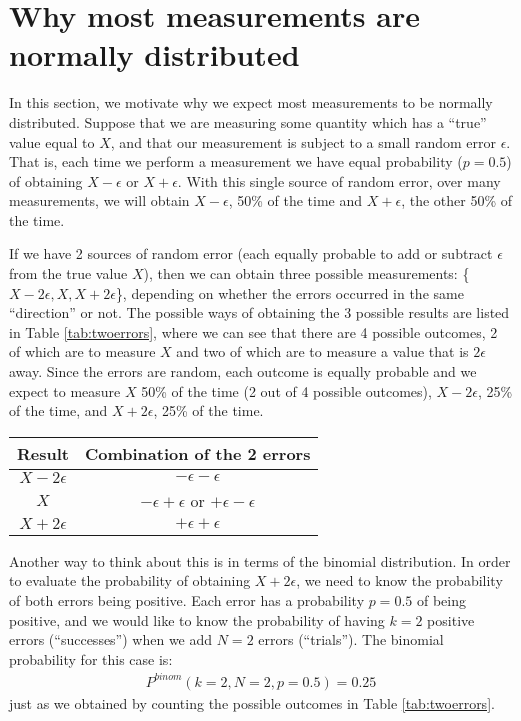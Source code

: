 \section{Why most measurements are normally distributed}
In this section, we motivate why we expect most measurements to be normally distributed. Suppose that we are measuring some quantity which has a ``true'' value equal to $X$, and that our measurement is subject to a small random error $\epsilon$. That is, each time we perform a measurement we have equal probability ($p=0.5$) of obtaining $X-\epsilon$ or $X+\epsilon$. With this single source of random error, over many measurements, we will obtain $X-\epsilon$, 50\% of the time and $X+\epsilon$, the other 50\% of the time.

 If we have 2 sources of random error (each equally probable to add or subtract $\epsilon$ from the true value $X$), then we can obtain three possible measurements: \{$X-2\epsilon,X,X+2\epsilon$\}, depending on whether the errors occurred in the same ``direction'' or not. The possible ways of obtaining the 3 possible results are listed in Table \ref{tab:twoerrors}, where we can see that there are 4 possible outcomes, 2 of which are to measure $X$ and two of which are to measure a value that is $2\epsilon$ away. Since the errors are random, each outcome is equally probable and we expect to measure $X$ 50\% of the time (2 out of 4 possible outcomes), $X-2\epsilon$, 25\% of the time, and $X+2\epsilon$, 25\% of the time.  
 
\begin{center}
\begin{tabular}{|c|c|}
\hline
\textbf{Result} & \textbf{Combination of the 2 errors}\\
\hline
$X-2\epsilon$ & $-\epsilon-\epsilon$\\
\hline
$X$ & $-\epsilon+\epsilon$ or $+\epsilon-\epsilon$\\
\hline
$X+2\epsilon$ & $+\epsilon+\epsilon$\\
\hline
\end{tabular}
\end{center}

Another way to think about this is in terms of the binomial distribution. In order to evaluate the probability of obtaining $X+2\epsilon$, we need to know the probability of both errors being positive. Each error has a probability $p=0.5$ of being positive, and we would like to know the probability of having $k=2$ positive errors (``successes'') when we add $N=2$ errors (``trials''). The binomial probability for this case is:
\begin{align*}
P^{binom}(k=2,N=2,p=0.5)=0.25
\end{align*} 
just as we obtained by counting the possible outcomes in Table \ref{tab:twoerrors}.


